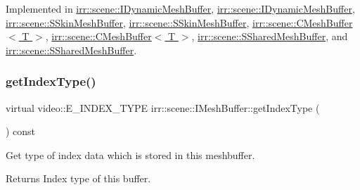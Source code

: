 Implemented in \hyperlink{classirr_1_1scene_1_1IDynamicMeshBuffer_adc483bdd7dfac4eb54e25c763ae1dae0}{irr\+::scene\+::\+I\+Dynamic\+Mesh\+Buffer}, \hyperlink{classirr_1_1scene_1_1IDynamicMeshBuffer_adc483bdd7dfac4eb54e25c763ae1dae0}{irr\+::scene\+::\+I\+Dynamic\+Mesh\+Buffer}, \hyperlink{structirr_1_1scene_1_1SSkinMeshBuffer_adc00b4ce3b46d952575203c6e275e592}{irr\+::scene\+::\+S\+Skin\+Mesh\+Buffer}, \hyperlink{structirr_1_1scene_1_1SSkinMeshBuffer_adc00b4ce3b46d952575203c6e275e592}{irr\+::scene\+::\+S\+Skin\+Mesh\+Buffer}, \hyperlink{classirr_1_1scene_1_1CMeshBuffer_ac5585f4983423a4ba1f4ab4aba112c95}{irr\+::scene\+::\+C\+Mesh\+Buffer$<$ T $>$}, \hyperlink{classirr_1_1scene_1_1CMeshBuffer_ac5585f4983423a4ba1f4ab4aba112c95}{irr\+::scene\+::\+C\+Mesh\+Buffer$<$ T $>$}, \hyperlink{structirr_1_1scene_1_1SSharedMeshBuffer_a97a95470c8956fc0120466e57698081a}{irr\+::scene\+::\+S\+Shared\+Mesh\+Buffer}, and \hyperlink{structirr_1_1scene_1_1SSharedMeshBuffer_a97a95470c8956fc0120466e57698081a}{irr\+::scene\+::\+S\+Shared\+Mesh\+Buffer}.

\mbox{\label{classirr_1_1scene_1_1IMeshBuffer_a8a993431c2c35420b62a577dc18dbdc2}} 
\subsubsection{\texorpdfstring{get\+Index\+Type()}{getIndexType()}\hspace{0.1cm}{\footnotesize\ttfamily [1/2]}}
{\footnotesize\ttfamily virtual video\+::\+E\+\_\+\+I\+N\+D\+E\+X\+\_\+\+T\+Y\+PE irr\+::scene\+::\+I\+Mesh\+Buffer\+::get\+Index\+Type (\begin{DoxyParamCaption}{ }\end{DoxyParamCaption}) const\hspace{0.3cm}{\ttfamily [pure virtual]}}



Get type of index data which is stored in this meshbuffer. 

\begin{DoxyReturn}{Returns}
Index type of this buffer. 
\end{DoxyReturn}


